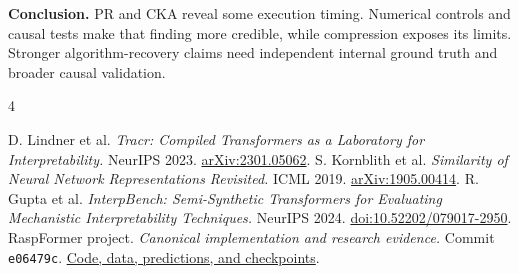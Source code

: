 \documentclass[11pt,a4paper]{article}
\begin{document}
\textbf{Conclusion.} PR and CKA reveal some execution timing. Numerical controls and causal tests make that finding more credible, while compression exposes its limits. Stronger algorithm-recovery claims need independent internal ground truth and broader causal validation.

\begin{thebibliography}{4}
\footnotesize\raggedright
{} D. Lindner et al. \emph{Tracr: Compiled Transformers as a Laboratory for Interpretability.} NeurIPS 2023. \href{https://arxiv.org/abs/2301.05062}{arXiv:2301.05062}.
 S. Kornblith et al. \emph{Similarity of Neural Network Representations Revisited.} ICML 2019. \href{https://arxiv.org/abs/1905.00414}{arXiv:1905.00414}.
 R. Gupta et al. \emph{InterpBench: Semi-Synthetic Transformers for Evaluating Mechanistic Interpretability Techniques.} NeurIPS 2024. \href{https://doi.org/10.52202/079017-2950}{doi:10.52202/079017-2950}.
 RaspFormer project. \emph{Canonical implementation and research evidence.} Commit \texttt{e06479c}. \href{https://github.com/raghulchandramouli/RaspFormer/tree/e06479ce09f10695aa5280162f80d880c060eaf5}{Code, data, predictions, and checkpoints}.
\end{thebibliography}
\end{document}
